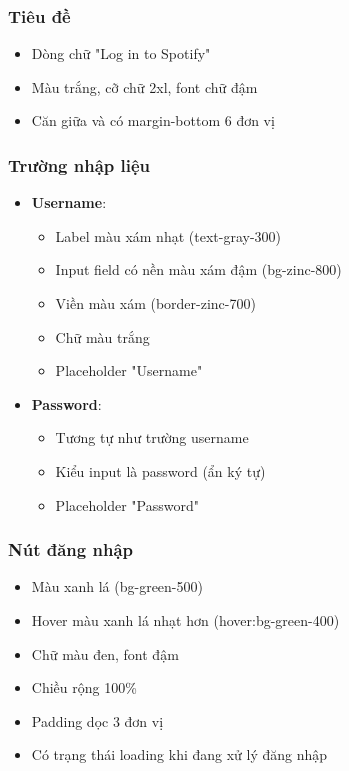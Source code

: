 \documentclass{book}
\begin{document}
\subsubsection{Tiêu đề}
\begin{itemize}
    \item Dòng chữ "Log in to Spotify"
    \item Màu trắng, cỡ chữ 2xl, font chữ đậm
    \item Căn giữa và có margin-bottom 6 đơn vị
\end{itemize}

\subsubsection{Trường nhập liệu}
\begin{itemize}
    \item \textbf{Username}:
    \begin{itemize}
        \item Label màu xám nhạt (text-gray-300)
        \item Input field có nền màu xám đậm (bg-zinc-800)
        \item Viền màu xám (border-zinc-700)
        \item Chữ màu trắng
        \item Placeholder "Username"
    \end{itemize}
    
    \item \textbf{Password}:
    \begin{itemize}
        \item Tương tự như trường username
        \item Kiểu input là password (ẩn ký tự)
        \item Placeholder "Password"
    \end{itemize}
\end{itemize}

\subsubsection{Nút đăng nhập}
\begin{itemize}
    \item Màu xanh lá (bg-green-500)
    \item Hover màu xanh lá nhạt hơn (hover:bg-green-400)
    \item Chữ màu đen, font đậm
    \item Chiều rộng 100\%
    \item Padding dọc 3 đơn vị
    \item Có trạng thái loading khi đang xử lý đăng nhập
\end{itemize}
\end{document}
